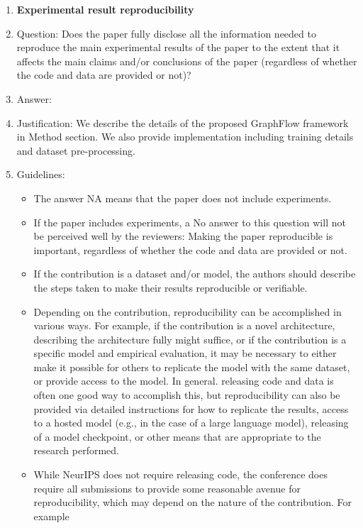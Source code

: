 \documentclass{article}
\begin{document}
\begin{enumerate}
    \item {\bf Experimental result reproducibility}
    \item[] Question: Does the paper fully disclose all the information needed to reproduce the main experimental results of the paper to the extent that it affects the main claims and/or conclusions of the paper (regardless of whether the code and data are provided or not)?
    \item[] Answer: \answerYes{} %
    \item[] Justification: We describe the details of the proposed GraphFlow framework in Method section. We also provide implementation including training details and dataset pre-processing.
    \item[] Guidelines:
    \begin{itemize}
        \item The answer NA means that the paper does not include experiments.
        \item If the paper includes experiments, a No answer to this question will not be perceived well by the reviewers: Making the paper reproducible is important, regardless of whether the code and data are provided or not.
        \item If the contribution is a dataset and/or model, the authors should describe the steps taken to make their results reproducible or verifiable. 
        \item Depending on the contribution, reproducibility can be accomplished in various ways. For example, if the contribution is a novel architecture, describing the architecture fully might suffice, or if the contribution is a specific model and empirical evaluation, it may be necessary to either make it possible for others to replicate the model with the same dataset, or provide access to the model. In general. releasing code and data is often one good way to accomplish this, but reproducibility can also be provided via detailed instructions for how to replicate the results, access to a hosted model (e.g., in the case of a large language model), releasing of a model checkpoint, or other means that are appropriate to the research performed.
        \item While NeurIPS does not require releasing code, the conference does require all submissions to provide some reasonable avenue for reproducibility, which may depend on the nature of the contribution. For example
        \begin{enumerate}

\end{enumerate}
\end{itemize}
\end{enumerate}
\end{document}
